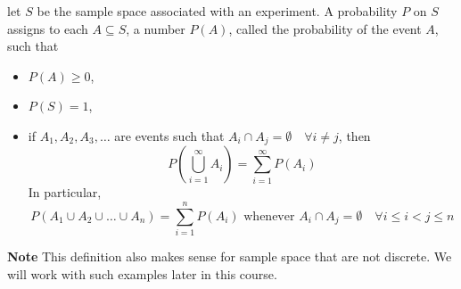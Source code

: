 \begin{definition}
    let $S$ be the sample space associated with an experiment. A probability
$P$ on $S$ assigns to each $A \subseteq S$, a number $P(A)$, called the
probability of the event $A$, such that
\begin{itemize}[noitemsep,topsep=0pt]
    \item $P(A) \geq 0$,
    \item $P(S) = 1$,
    \item if $A_1, A_2, A_3, \dots$ are events such that $A_i \cap A_j =
          \emptyset \quad \forall i \neq j$, then
          \begin{equation*}
              P(\bigcup_{i=1}^{\infty}A_i) = \sum_{i=1}^{\infty} P(A_i)
          \end{equation*}
          In particular,
          \begin{equation*}
              P(A_1 \cup A_2 \cup \dots \cup A_n) = \sum_{i=1}^n P(A_i)
              \text{ whenever }
              A_i \cap A_j = \emptyset \quad \forall i \leq i < j \leq n
          \end{equation*}
\end{itemize}
\end{definition}

\textbf{Note} This definition also makes sense for sample space that are not
discrete. We will work with such examples later in this course.

